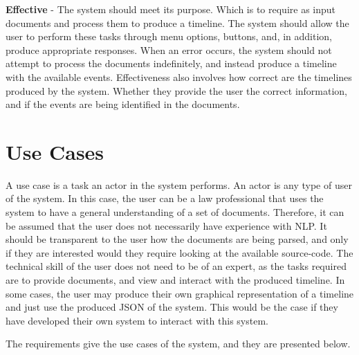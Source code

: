 \par \textbf{Effective} - The system should meet its purpose. Which is to require as input documents and process them to produce a timeline. The system should allow the user to perform these tasks through menu options, buttons, and, in addition, produce appropriate responses. When an error occurs, the system should not attempt to process the documents indefinitely, and instead produce a timeline with the available events. Effectiveness also involves how correct are the timelines produced by the system. Whether they provide the user the correct information, and if the events are being identified in the documents. 

\section{Use Cases}
\par A use case is a task an actor in the system performs. An actor is any type of user of the system. In this case, the user can be a law professional that uses the system to have a general understanding of a set of documents. Therefore, it can be assumed that the user does not necessarily have experience with NLP. It should be transparent to the user how the documents are being parsed, and only if they are interested would they require looking at the available source-code. The technical skill of the user does not need to be of an expert, as the tasks required are to provide documents, and view and interact with the produced timeline. In some cases, the user may produce their own graphical representation of a timeline and just use the produced JSON of the system. This would be the case if they have developed their own system to interact with this system.
\par The requirements give the use cases of the system, and they are presented below. 

